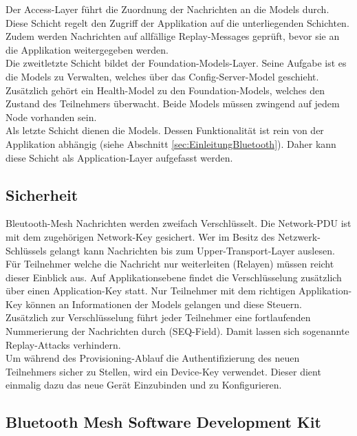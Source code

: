 Der Access-Layer führt die Zuordnung der Nachrichten an die Models durch. Diese Schicht regelt den Zugriff der Applikation auf die unterliegenden Schichten. Zudem werden Nachrichten auf allfällige Replay-Messages geprüft, bevor sie an die Applikation weitergegeben werden. \\

Die zweitletzte Schicht bildet der Foundation-Models-Layer. Seine Aufgabe ist es die Models zu Verwalten, welches über das Config-Server-Model geschieht. Zusätzlich gehört ein Health-Model zu den Foundation-Models, welches den Zustand des Teilnehmers überwacht. Beide Models müssen zwingend auf jedem Node vorhanden sein. \cite{bluetooth_sig_mesh_netzwerk_spezifikationen_2020} \cite{bluetooth_sig_mesh-technology-overviewpdf_2020}  \\

Als letzte Schicht dienen die Models. Dessen Funktionalität ist rein von der Applikation abhängig (siehe Abschnitt \ref{sec:EinleitungBluetooth}). Daher kann diese Schicht als Application-Layer aufgefasst werden.  \\


\subsection{Sicherheit}\label{subsec:BleutoothMeshSicherheit}
Bleutooth-Mesh Nachrichten werden zweifach Verschlüsselt. Die Network-PDU ist mit dem zugehörigen Network-Key gesichert. Wer im Besitz des Netzwerk-Schlüssels gelangt kann Nachrichten bis zum Upper-Transport-Layer auslesen. Für Teilnehmer welche die Nachricht nur weiterleiten (Relayen) müssen reicht dieser Einblick aus. Auf Applikationsebene findet die Verschlüsselung zusätzlich über einen Application-Key statt. Nur Teilnehmer mit dem richtigen Applikation-Key können an Informationen der Models gelangen und diese Steuern. \\

Zusätzlich zur Verschlüsselung führt jeder Teilnehmer eine fortlaufenden Nummerierung der Nachrichten durch (SEQ-Field). Damit lassen sich sogenannte Replay-Attacks verhindern. \\

Um während des Provisioning-Ablauf die Authentifizierung des neuen Teilnehmers sicher zu Stellen, wird ein Device-Key verwendet. Dieser dient einmalig dazu das neue Gerät Einzubinden und zu Konfigurieren. 



\subsection{Bluetooth Mesh Software Development Kit}\label{sec:BluetoothMeshSoftwareDevelopmentKit}

